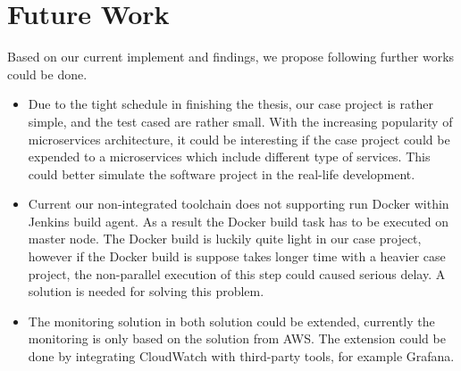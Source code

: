\section{Future Work}
Based on our current implement and findings, we propose following further works could be done.
\begin{itemize}
    \item Due to the tight schedule in finishing the thesis, our case project is rather simple, and the test cased are rather small.  With the increasing popularity of microservices architecture, it could be interesting if the case project could be expended to a microservices which include different type of services. This could better simulate the software project in the real-life development.
    \item Current our non-integrated toolchain does not supporting run Docker within Jenkins build agent. As a result the Docker build task has to be executed on master node. The Docker build is luckily quite light in our case project, however if the Docker build is suppose takes longer time with a heavier case project, the non-parallel execution of this step could caused serious delay. A solution is needed for solving this problem.
    \item The monitoring solution in both solution could be extended, currently the monitoring is only based on the solution from AWS. The extension could be done by integrating CloudWatch with third-party tools, for example Grafana.
\end{itemize}

